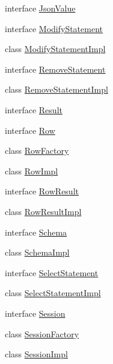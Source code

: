 \begin{DoxyCompactItemize}
\item 
interface \mbox{\hyperlink{interfacecom_1_1mysql_1_1cj_1_1xdevapi_1_1_json_value}{Json\+Value}}
\item 
interface \mbox{\hyperlink{interfacecom_1_1mysql_1_1cj_1_1xdevapi_1_1_modify_statement}{Modify\+Statement}}
\item 
class \mbox{\hyperlink{classcom_1_1mysql_1_1cj_1_1xdevapi_1_1_modify_statement_impl}{Modify\+Statement\+Impl}}
\item 
interface \mbox{\hyperlink{interfacecom_1_1mysql_1_1cj_1_1xdevapi_1_1_remove_statement}{Remove\+Statement}}
\item 
class \mbox{\hyperlink{classcom_1_1mysql_1_1cj_1_1xdevapi_1_1_remove_statement_impl}{Remove\+Statement\+Impl}}
\item 
interface \mbox{\hyperlink{interfacecom_1_1mysql_1_1cj_1_1xdevapi_1_1_result}{Result}}
\item 
interface \mbox{\hyperlink{interfacecom_1_1mysql_1_1cj_1_1xdevapi_1_1_row}{Row}}
\item 
class \mbox{\hyperlink{classcom_1_1mysql_1_1cj_1_1xdevapi_1_1_row_factory}{Row\+Factory}}
\item 
class \mbox{\hyperlink{classcom_1_1mysql_1_1cj_1_1xdevapi_1_1_row_impl}{Row\+Impl}}
\item 
interface \mbox{\hyperlink{interfacecom_1_1mysql_1_1cj_1_1xdevapi_1_1_row_result}{Row\+Result}}
\item 
class \mbox{\hyperlink{classcom_1_1mysql_1_1cj_1_1xdevapi_1_1_row_result_impl}{Row\+Result\+Impl}}
\item 
interface \mbox{\hyperlink{interfacecom_1_1mysql_1_1cj_1_1xdevapi_1_1_schema}{Schema}}
\item 
class \mbox{\hyperlink{classcom_1_1mysql_1_1cj_1_1xdevapi_1_1_schema_impl}{Schema\+Impl}}
\item 
interface \mbox{\hyperlink{interfacecom_1_1mysql_1_1cj_1_1xdevapi_1_1_select_statement}{Select\+Statement}}
\item 
class \mbox{\hyperlink{classcom_1_1mysql_1_1cj_1_1xdevapi_1_1_select_statement_impl}{Select\+Statement\+Impl}}
\item 
interface \mbox{\hyperlink{interfacecom_1_1mysql_1_1cj_1_1xdevapi_1_1_session}{Session}}
\item 
class \mbox{\hyperlink{classcom_1_1mysql_1_1cj_1_1xdevapi_1_1_session_factory}{Session\+Factory}}
\item 
class \mbox{\hyperlink{classcom_1_1mysql_1_1cj_1_1xdevapi_1_1_session_impl}{Session\+Impl}}
\item 

\end{DoxyCompactItemize}
